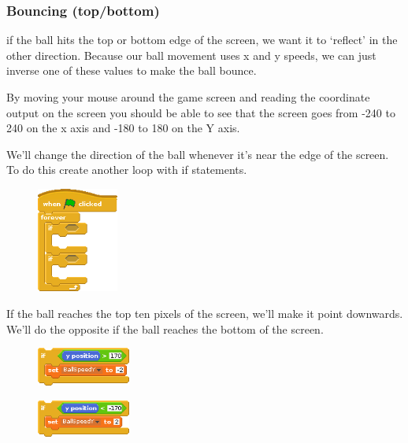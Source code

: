 		\subsubsection{Bouncing (top/bottom)}
		
			if the ball hits the top or bottom edge of the screen, we want it to `reflect' in the other direction. Because our ball movement uses x and y speeds, we can just inverse one of these values to make the ball bounce.
			
			By moving your mouse around the game screen and reading the coordinate output on the screen you should be able to see that the screen goes from -240 to 240 on the x axis and -180 to 180 on the Y axis.
			
		    We'll change the direction of the ball whenever it's near the edge of the screen. To do this create another loop with if statements.
			
			\begin{figure}[h!]
				\centering
				\includegraphics[width=101px]{McrRaspJam/018_ScratchGames/code/2_loop}
				\label{fig:ballloop}
			\end{figure}
			
			If the ball reaches the top ten pixels of the screen, we'll make it point downwards. We'll do the opposite if the ball reaches the bottom of the screen.
			
			\begin{figure}[h!]
				\centering
				\includegraphics[width=116px]{McrRaspJam/018_ScratchGames/code/3_ballbounce1}
				\label{fig:ballbounce1}
			\end{figure}
		
			\begin{figure}[h!]
				\centering
				\includegraphics[width=116px]{McrRaspJam/018_ScratchGames/code/3_ballbounce2}
				\label{fig:ballbounce2}
			\end{figure}
		
